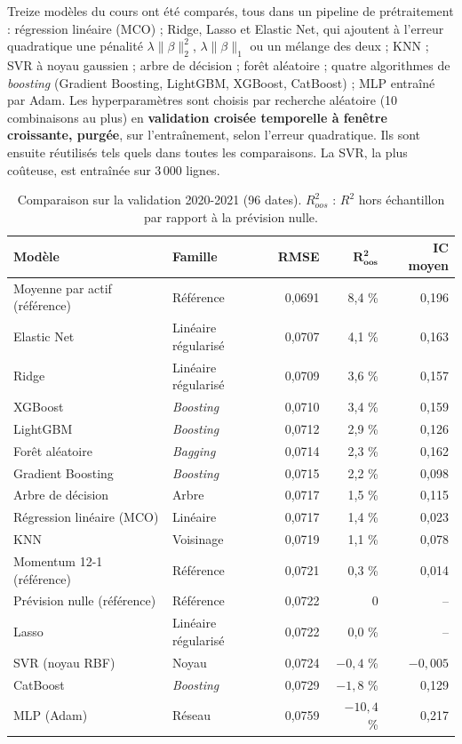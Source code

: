 Treize modèles du cours ont été comparés, tous dans un pipeline de prétraitement : régression linéaire (MCO) ; Ridge, Lasso et Elastic Net, qui ajoutent à l'erreur quadratique une pénalité $\lambda\lVert\beta\rVert_2^2$, $\lambda\lVert\beta\rVert_1$ ou un mélange des deux ; KNN ; SVR à noyau gaussien ; arbre de décision ; forêt aléatoire ; quatre algorithmes de \emph{boosting} (Gradient Boosting, LightGBM, XGBoost, CatBoost) ; MLP entraîné par Adam. Les hyperparamètres sont choisis par recherche aléatoire (10 combinaisons au plus) en \textbf{validation croisée temporelle à fenêtre croissante, purgée}, sur l'entraînement, selon l'erreur quadratique. Ils sont ensuite réutilisés tels quels dans toutes les comparaisons. La SVR, la plus coûteuse, est entraînée sur 3\,000 lignes.

\begin{table}[!htb]
  \centering
  \small
  \caption{Comparaison sur la validation 2020-2021 (96 dates). $R^2_{oos}$ : $R^2$ hors échantillon par rapport à la prévision nulle.}
  \label{tab:prev_val}
  \begin{tabular}{@{}l l r r r@{}}
    \toprule
    \textbf{Modèle} & \textbf{Famille} & \textbf{RMSE} & $\boldsymbol{R^2_{oos}}$ & \textbf{IC moyen} \\
    \midrule
    Moyenne par actif (référence) & Référence & 0,0691 & 8,4 \% & 0,196 \\
    Elastic Net & Linéaire régularisé & 0,0707 & 4,1 \% & 0,163 \\
    Ridge & Linéaire régularisé & 0,0709 & 3,6 \% & 0,157 \\
    XGBoost & \emph{Boosting} & 0,0710 & 3,4 \% & 0,159 \\
    LightGBM & \emph{Boosting} & 0,0712 & 2,9 \% & 0,126 \\
    Forêt aléatoire & \emph{Bagging} & 0,0714 & 2,3 \% & 0,162 \\
    Gradient Boosting & \emph{Boosting} & 0,0715 & 2,2 \% & 0,098 \\
    Arbre de décision & Arbre & 0,0717 & 1,5 \% & 0,115 \\
    Régression linéaire (MCO) & Linéaire & 0,0717 & 1,4 \% & 0,023 \\
    KNN & Voisinage & 0,0719 & 1,1 \% & 0,078 \\
    Momentum 12-1 (référence) & Référence & 0,0721 & 0,3 \% & 0,014 \\
    Prévision nulle (référence) & Référence & 0,0722 & 0 & -- \\
    Lasso & Linéaire régularisé & 0,0722 & 0,0 \% & -- \\
    SVR (noyau RBF) & Noyau & 0,0724 & $-0{,}4$ \% & $-0{,}005$ \\
    CatBoost & \emph{Boosting} & 0,0729 & $-1{,}8$ \% & 0,129 \\
    MLP (Adam) & Réseau & 0,0759 & $-10{,}4$ \% & 0,217 \\
    \bottomrule
  \end{tabular}
\end{table}

